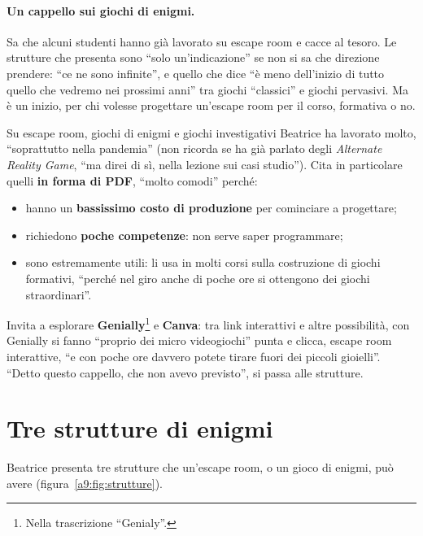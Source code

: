 \paragraph{Un cappello sui giochi di enigmi.} Sa che alcuni studenti hanno già
lavorato su escape room e cacce al tesoro. Le strutture che presenta sono ``solo
un'indicazione'' se non si sa che direzione prendere: ``ce ne sono infinite'', e quello
che dice ``è meno dell'inizio di tutto quello che vedremo nei prossimi anni'' tra
giochi ``classici'' e giochi pervasivi. Ma è un inizio, per chi volesse progettare
un'escape room per il corso, formativa o no.

Su escape room, giochi di enigmi e giochi investigativi Beatrice ha lavorato molto,
``soprattutto nella pandemia'' (non ricorda se ha già parlato degli \emph{Alternate
Reality Game}, ``ma direi di sì, nella lezione sui casi studio''). Cita in particolare
quelli \textbf{in forma di PDF}, ``molto comodi'' perché:
\begin{itemize}
  \item hanno un \textbf{bassissimo costo di produzione} per cominciare a progettare;
  \item richiedono \textbf{poche competenze}: non serve saper programmare;
  \item sono estremamente utili: li usa in molti corsi sulla costruzione di giochi
        formativi, ``perché nel giro anche di poche ore si ottengono dei giochi
        straordinari''.
\end{itemize}
Invita a esplorare \textbf{Genially}\footnote{Nella trascrizione ``Genialy''.} e
\textbf{Canva}: tra link interattivi e altre possibilità, con Genially si fanno
``proprio dei micro videogiochi'' punta e clicca, escape room interattive, ``e con
poche ore davvero potete tirare fuori dei piccoli gioielli''. ``Detto questo cappello,
che non avevo previsto'', si passa alle strutture.

\section{Tre strutture di enigmi}
\label{a9:sec:strutture}



Beatrice presenta tre strutture che un'escape room, o un gioco di enigmi, può avere
(figura~\ref{a9:fig:strutture}).

